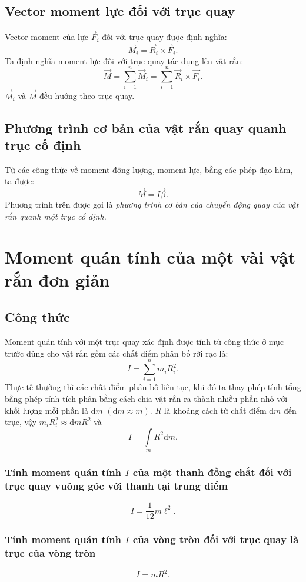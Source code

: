 \subsection{Vector moment lực đối với trục quay}
Vector moment của lực $\overrightarrow{F}_i$ đối với trục quay được định nghĩa:
$$\overrightarrow{M}_i = \overrightarrow{R}_i \times \overrightarrow{F}_i.$$
Ta định nghĩa moment lực đối với trục quay tác dụng lên vật rắn:
$$\overrightarrow M  = \sum\limits_{i = 1}^n {{{\overrightarrow M }_i}}  = \sum\limits_{i = 1}^n {{{\overrightarrow R }_i} \times \overrightarrow {{F_i}} } .$$
$\overrightarrow{M}_i$ và $\overrightarrow{M}$ đều hướng theo trục quay.
\subsection{Phương trình cơ bản của vật rắn quay quanh trục cố định}
Từ các công thức về moment động lượng, moment lực, bằng các phép đạo hàm, ta được:
$$\overrightarrow{M} = I \overrightarrow{\beta}.$$
Phương trình trên được gọi là \textit{phương trình cơ bản của chuyển động quay của vật rắn quanh một trục cố định.}
\section{Moment quán tính của một vài vật rắn đơn giản}
\subsection{Công thức}
Moment quán tính với một trục quay xác định được tính từ công thức ở mục trước dùng cho vật rắn gồm các chất điểm phân bố rời rạc là:
$$I = \sum\limits_{i = 1}^n {{m_i}R_i^2} .$$
Thực tế thường thì các chất điểm phân bố liên tục, khi đó ta thay phép tính tổng bằng phép tính tích phân bằng cách chia vật rắn ra thành nhiều phần nhỏ với khối lượng mỗi phần là $\mathrm{d}m$ $\left( {\mathrm{d}m \approx m} \right).$ $R$ là khoảng cách từ chất điểm $\mathrm{d}m$ đến trục, vậy $m_i R_i^2 \approx \mathrm{d}m R^2$ và
$$I = \int\limits_m {{R^2}\mathrm{d}m} .$$
\subsubsection{Tính moment quán tính $I$ của một thanh đồng chất đối với trục quay vuông góc với thanh tại trung điểm}
$$ I = \frac{1}{12} m \ell^2. $$
\subsubsection{Tính moment quán tính $I$ của vòng tròn đối với trục quay là trục của vòng tròn}
$$I = mR^2.$$
